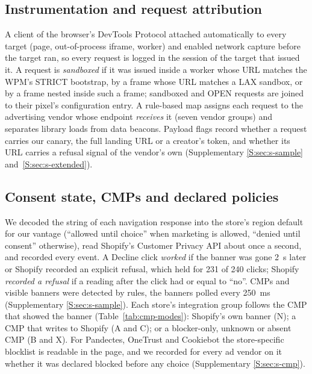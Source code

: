 \subsection{Instrumentation and request attribution}\label{sec:method-attr}

A client of the browser's DevTools Protocol \citep{cdp} attached automatically to every target (page, out-of-process iframe, worker) and enabled network capture before the target ran, so every request is logged in the session of the target that issued it. A request is \emph{sandboxed} if it was issued inside a worker whose URL matches the WPM's STRICT bootstrap, by a frame whose URL matches a LAX sandbox, or by a frame nested inside such a frame; sandboxed and OPEN requests are joined to their pixel's configuration entry. A rule-based map assigns each request to the advertising vendor whose endpoint \emph{receives} it (seven vendor groups) and separates library loads from data beacons. Payload flags record whether a request carries our canary, the full landing URL or a creator's token, and whether its URL carries a refusal signal of the vendor's own (Supplementary \ref*{S:sec:s-sample} and~\ref*{S:sec:s-extended}).

\subsection{Consent state, CMPs and declared policies}\label{sec:method-consent}

We decoded the  string of each navigation response into the store's region default for our vantage (``allowed until choice'' when marketing is allowed, ``denied until consent'' otherwise), read Shopify's Customer Privacy API about once a second, and recorded every  event. A Decline click \emph{worked} if the banner was gone 2~s later or Shopify recorded an explicit refusal, which held for 231 of 240 clicks; Shopify \emph{recorded a refusal} if a reading after the click had  or  equal to ``no''. CMPs and visible banners were detected by rules, the banners polled every 250~ms (Supplementary \ref*{S:sec:s-sample}). Each store's integration group follows the CMP that showed the banner (Table~\ref{tab:cmp-modes}): Shopify's own banner (N); a CMP that writes to Shopify (A and C); or a blocker-only, unknown or absent CMP (B and X). For Pandectes, OneTrust and Cookiebot the store-specific blocklist is readable in the page, and we recorded for every ad vendor on it whether it was declared blocked before any choice (Supplementary \ref*{S:sec:s-cmp}).

